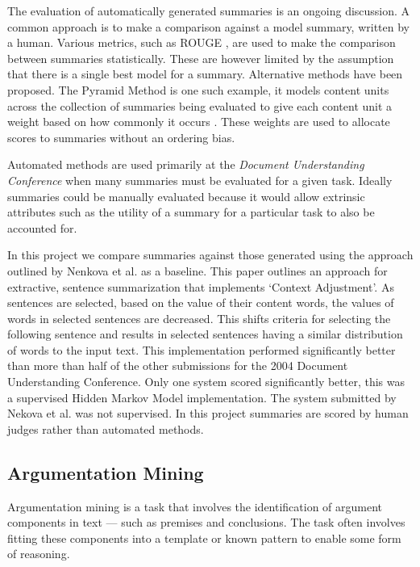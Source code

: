         The evaluation of automatically generated summaries is an ongoing discussion. A common approach is to make a comparison against a model summary, written by a human. Various metrics, such as ROUGE \cite{lin2004rouge}, are used to make the comparison between summaries statistically. These are however limited by the assumption that there is a single best model for a summary. Alternative methods have been proposed. The Pyramid Method is one such example, it models content units across the collection of summaries being evaluated to give each content unit a weight based on how commonly it occurs \cite{nenkova2004evaluating}. These weights are used to allocate scores to summaries without an ordering bias.

        Automated methods are used primarily at the \textit{Document Understanding Conference} when many summaries must be evaluated for a given task. Ideally summaries could be manually evaluated because it would allow extrinsic attributes such as the utility of a summary for a particular task to also be accounted for.

        In this project we compare summaries against those generated using the approach outlined by Nenkova et al. \cite{nenkova2006compositional} as a baseline. This paper outlines an approach for extractive, sentence summarization that implements `Context Adjustment'. As sentences are selected, based on the value of their content words, the values of words in selected sentences are decreased. This shifts criteria for selecting the following sentence and results in selected sentences having a similar distribution of words to the input text. This implementation performed significantly better than more than half of the other submissions for the 2004 Document Understanding Conference. Only one system scored significantly better, this was a supervised Hidden Markov Model implementation. The system submitted by Nekova et al. was not supervised. In this project summaries are scored by human judges rather than automated methods.

    \tocless\subsection{Argumentation Mining}
      Argumentation mining is a task that involves the identification of argument components in text --- such as premises and conclusions. The task often involves fitting these components into a template or known pattern to enable some form of reasoning. \cite{palau2009argumentation}


